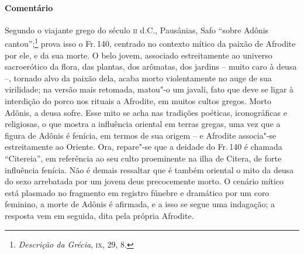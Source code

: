 {\paragraph{Comentário} Segundo o viajante grego do século \textsc{ii} d.C., Pausânias, Safo ``sobre
Adônis cantou'';\footnote{\textit{Descrição da Grécia}, \textsc{ix}, 29, 8.} prova isso o Fr.\,140, 
centrado no contexto mítico da paixão de Afrodite por ele, e da sua morte.
O belo jovem, associado estreitamente ao universo sacroerótico da
flora, das plantas, dos arômatas, dos jardins -- muito caro à deusa --,
tornado alvo da paixão dela, acaba morto violentamente no auge de sua
virilidade; na versão mais retomada, matou"-o um javali, fato que deve se ligar
à interdição do porco nos rituais a Afrodite, em muitos cultos gregos. Morto
Adônis, a deusa sofre. Esse mito se acha nas tradições poéticas, iconográficas
e religiosas, o que mostra a influência oriental em terras gregas, uma vez que
a figura de Adônis é fenícia, em termos de sua origem -- e Afrodite associa"-se
estreitamente ao Oriente. Ora, repare"-se que a deidade do Fr.\,140 é chamada
``Citereia'', em referência ao seu culto proeminente na ilha de Citera,
de forte influência fenícia.
Não é demais ressaltar que é também oriental o
mito da deusa do sexo arrebatada por um jovem deus precocemente morto. O
cenário mítico está plasmado no fragmento em registro fúnebre e dramático por um coro feminino, a morte de Adônis é afirmada, e a isso
se segue uma indagação; a resposta vem em seguida, dita pela própria Afrodite.

}
